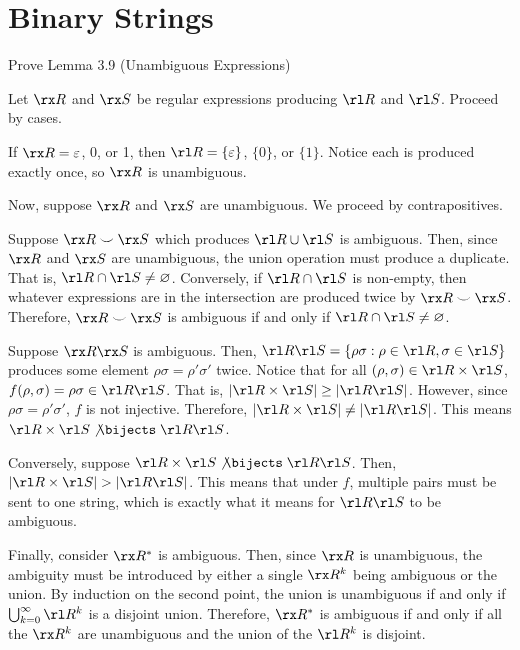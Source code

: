 \section{Binary Strings}

\begin{xca}
  Prove Lemma 3.9 (Unambiguous Expressions)
\end{xca}
\begin{prf}
  Let $\rx R$ and $\rx S$ be regular expressions producing $\rl R$ and $\rl S$.
  Proceed by cases.

  If $\rx R = \varepsilon$, 0, or 1, then $\rl R = \{\varepsilon\}$, $\{0\}$, or $\{1\}$.
  Notice each is produced exactly once, so $\rx R$ is unambiguous.

  Now, suppose $\rx R$ and $\rx S$ are unambiguous.
  We proceed by contrapositives.

  Suppose $\rx R \smile \rx S$ which produces $\rl R \cup \rl S$ is ambiguous.
  Then, since $\rx R$ and $\rx S$ are unambiguous,
  the union operation must produce a duplicate.
  That is, $\rl R \cap \rl S \neq \varnothing$.
  Conversely, if $\rl R \cap \rl S$ is non-empty,
  then whatever expressions are in the intersection are produced twice by $\rx R \smile \rx S$.
  Therefore, $\rx R \smile \rx S$ is ambiguous if and only if $\rl R \cap \rl S \neq \varnothing$.

  Suppose $\rx R\rx S$ is ambiguous.
  Then, $\rl R \rl S = \{\rho\sigma : \rho \in \rl R, \sigma \in \rl S\}$
  produces some element $\rho\sigma = \rho'\sigma'$ twice.
  Notice that for all $(\rho,\sigma) \in \rl R \times \rl S$, $f(\rho,\sigma) = \rho\sigma \in \rl R \rl S$.
  That is, $\abs{\rl R \times \rl S} \geq \abs{\rl R \rl S}$.
  However, since $\rho\sigma = \rho'\sigma'$, $f$ is not injective.
  Therefore, $\abs{\rl R \times \rl S} \neq \abs{\rl R \rl S}$.
  This means $\rl R\times\rl S \mathrel{\not\bijects} \rl R\rl S$.

  Conversely, suppose $\rl R\times\rl S \mathrel{\not\bijects} \rl R\rl S$.
  Then, $\abs{\rl R \times \rl S} > \abs{\rl R \rl S}$.
  This means that under $f$, multiple pairs must be sent to one string,
  which is exactly what it means for $\rl R\rl S$ to be ambiguous.

  Finally, consider $\rx R^*$ is ambiguous.
  Then, since $\rx R$ is unambiguous, the ambiguity must be introduced
  by either a single $\rx R^k$ being ambiguous or the union.
  By induction on the second point, the union is unambiguous if and only if
  $\bigcup_{k=0}^\infty \rl R^k$ is a disjoint union.
  Therefore, $\rx R^*$ is ambiguous if and only if all the $\rx R^k$ are unambiguous
  and the union of the $\rl R^k$ is disjoint.
\end{prf}

